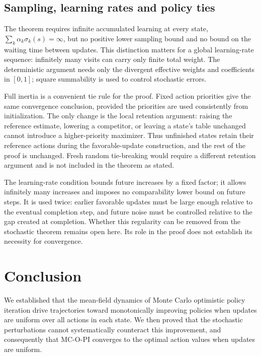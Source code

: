 \subsection{Sampling, learning rates and policy ties}
\label{sec: relaxing conditions}
The theorem requires infinite accumulated learning at every state, $\sum_k\alpha_k\sigma_k(s)=\infty$, but no positive lower sampling bound and no bound on the waiting time between updates. This distinction matters for a global learning-rate sequence: infinitely many visits can carry only finite total weight. The deterministic argument needs only the divergent effective weights and coefficients in $[0,1]$; square summability is used to control stochastic errors.

Full inertia is a convenient tie rule for the proof. Fixed action priorities give the same convergence conclusion, provided the priorities are used consistently from initialization. The only change is the local retention argument: raising the reference estimate, lowering a competitor, or leaving a state's table unchanged cannot introduce a higher-priority maximizer. Thus unfinished states retain their reference actions during the favorable-update construction, and the rest of the proof is unchanged. Fresh random tie-breaking would require a different retention argument and is not included in the theorem as stated.

The learning-rate condition bounds future increases by a fixed factor; it allows infinitely many increases and imposes no comparability lower bound on future steps. It is used twice: earlier favorable updates must be large enough relative to the eventual completion step, and future noise must be controlled relative to the gap created at completion. Whether this regularity can be removed from the stochastic theorem remains open here. Its role in the proof does not establish its necessity for convergence.

\section{Conclusion}






We established that the mean-field dynamics of Monte Carlo optimistic policy iteration drive trajectories toward monotonically improving policies when updates are uniform over all actions in each state. 
We then proved that the stochastic perturbations cannot systematically counteract this improvement,
and consequently that MC-O-PI converges to the optimal action values when updates are uniform.



